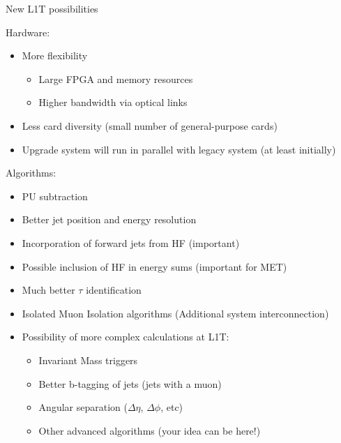 \documentclass[8pt]{beamer}
\begin{document}
\begin{frame}{New L1T possibilities}
 
\begin{block}{Hardware:}

\begin{itemize}
  \item More flexibility
  \begin{itemize}
    \item Large FPGA and memory resources
    \item Higher bandwidth via optical links
  \end{itemize}
  \item Less card diversity (small number of general-purpose cards)
  \item Upgrade system will run in parallel with legacy system (at least initially)
\end{itemize}

 
\end{block}

\begin{block}{Algorithms:}

\begin{itemize}
  \item PU subtraction
  \item Better jet position and energy resolution
  \item Incorporation of forward jets from HF (important)
  \item Possible inclusion of HF in energy sums (important for MET)
  \item Much better $\tau$ identification
  \item Isolated Muon Isolation algorithms (Additional system interconnection)
  \item Possibility of more complex calculations at L1T:
  \begin{itemize}
    \item Invariant Mass triggers
    \item Better b-tagging of jets (jets with a muon)
    \item Angular separation ($\Delta\eta$, $\Delta\phi$, etc)
    \item Other advanced algorithms (your idea can be here!)
  \end{itemize}
\end{itemize}

\end{block}

\end{frame}
\end{document}
